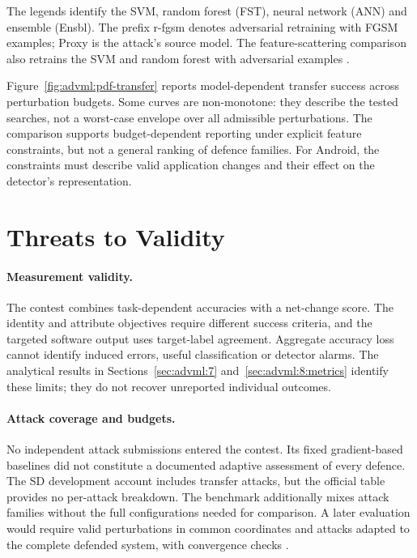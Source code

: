 The legends identify the SVM, random forest (FST), neural network (ANN) and ensemble (Ensbl).
The prefix r-fgsm denotes adversarial retraining with FGSM examples; Proxy is the attack's
source model. The feature-scattering comparison also retrains the SVM and random forest
with adversarial examples \cite{sparta2021d75}.

Figure~\ref{fig:advml:pdf-transfer} reports model-dependent transfer success across perturbation
budgets. Some curves are non-monotone: they describe the tested searches, not a worst-case
envelope over all admissible perturbations. The comparison supports budget-dependent reporting
under explicit feature constraints, but not a general ranking of defence families. For Android,
the constraints must describe valid application changes and their effect on the detector's
representation.

\section{Threats to Validity}
\label{sec:advml:9}

\paragraph{Measurement validity.} The contest combines task-dependent accuracies with a
net-change score. The identity and attribute objectives require different success criteria,
and the targeted software output uses target-label agreement. Aggregate accuracy loss
cannot identify induced errors, useful classification or detector alarms. The analytical
results in Sections~\ref{sec:advml:7} and~\ref{sec:advml:8:metrics} identify these limits;
they do not recover unreported individual outcomes.

\paragraph{Attack coverage and budgets.} No independent attack submissions entered the
contest. Its fixed gradient-based baselines did not constitute a documented adaptive
assessment of every defence. The SD development account includes transfer attacks, but
the official table provides no per-attack breakdown. The benchmark additionally mixes
attack families without the full configurations needed for comparison. A later evaluation
would require valid perturbations in common coordinates and attacks adapted to the complete
defended system, with convergence checks \cite{carlini2019evaluating,tramer2020adaptive}.

